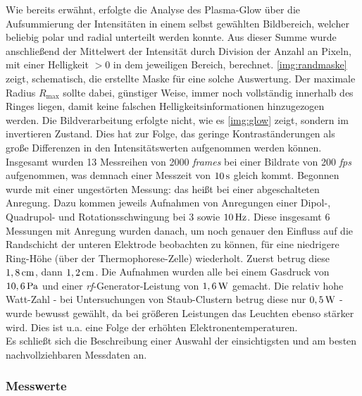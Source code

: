 \documentclass[numbers=noenddot,a4paper]{scrartcl}
\newcommand{\ix}[1]{_\text{#1}}
\newcommand{\tilt}[1]{\textit{#1}}
\begin{document}
		Wie bereits erwähnt, erfolgte die Analyse des Plasma-Glow über die Aufsummierung der Intensitäten in einem selbst gewählten Bildbereich, welcher beliebig polar und radial unterteilt werden konnte. Aus dieser Summe wurde anschließend der Mittelwert der Intensität durch Division der Anzahl an Pixeln, mit einer Helligkeit $>0$ in dem jeweiligen Bereich, berechnet. \ref{img:randmaske} zeigt, schematisch, die erstellte Maske für eine solche Auswertung. Der maximale Radius $R\ix{max}$ sollte dabei, günstiger Weise, immer noch vollständig innerhalb des Ringes liegen, damit keine falschen Helligkeitsinformationen hinzugezogen werden. Die Bildverarbeitung erfolgte nicht, wie es \ref{img:glow} zeigt, sondern im invertieren Zustand. Dies hat zur Folge, das geringe Kontraständerungen als große Differenzen in den Intensitätswerten aufgenommen werden können. \\
		Insgesamt wurden 13 Messreihen von 2000 \tilt{frames} bei einer Bildrate von 200 \tilt{fps} aufgenommen, was demnach einer Messzeit von $\unit[10]{s}$ gleich kommt. Begonnen wurde mit einer ungestörten Messung: das heißt bei einer abgeschalteten Anregung. Dazu kommen jeweils Aufnahmen von Anregungen einer Dipol-, Quadrupol- und Rotationsschwingung bei 3 sowie  $\unit[10]{Hz}$. Diese insgesamt 6 Messungen mit Anregung wurden danach, um noch genauer den Einfluss auf die Randschicht der unteren Elektrode beobachten zu können, für eine niedrigere Ring-Höhe (über der Thermophorese-Zelle) wiederholt. Zuerst betrug diese $\unit[1,8]{cm}$, dann $\unit[1,2]{cm}$. Die Aufnahmen wurden alle bei einem Gasdruck von $\unit[10,6]{Pa}$ und einer \tilt{rf}-Generator-Leistung von $\unit[1,6]{W}$ gemacht. Die relativ hohe Watt-Zahl - bei Untersuchungen von Staub-Clustern betrug diese nur $\unit[0,5]{W}$ - wurde bewusst gewählt, da bei größeren Leistungen das Leuchten ebenso stärker wird. Dies ist u.a. eine Folge der erhöhten Elektronentemperaturen. \\
		Es schließt sich die Beschreibung einer Auswahl der einsichtigsten und am besten nachvollziehbaren Messdaten an. 

			\subsubsection{Messwerte}
\end{document}
